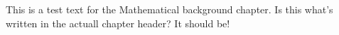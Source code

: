 This is a test text for the Mathematical background chapter.
Is this what's written in the actuall chapter header?
It should be!

